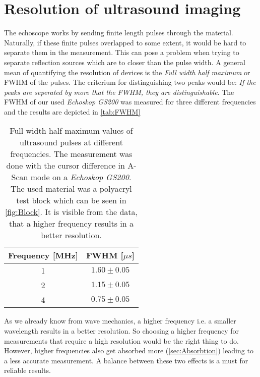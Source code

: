 \documentclass[a4paper,10pt,twocolumn]{article}
\begin{document}
    
    
    \section{Resolution of ultrasound imaging}\label{sec:Resolution}
    The echoscope works by sending finite length pulses through the material.
    Naturally, if these finite pulses overlapped to some extent, it would be hard to separate them in the measurement.
    This can pose a problem when trying to separate reflection sources which are to closer than the pulse width.
    A general mean of quantifying the resolution of devices is the \textit{Full width half maximum} or FWHM of the pulses.
    The criterium for distinguishing two peaks would be: \textit{If the peaks are seperated by more that the FWHM, they are distinguishable}.
    The FWHM of our used \textit{Echoskop GS200} was measured for three different frequencies and the results are depicted in \autoref{tab:FWHM}
    \begin{table}[htbp]
        \centering
        \begin{tabular*}{0.9\linewidth}{@{\extracolsep{\fill}}cc}
            \hline
            \hline
            \rule[-7pt]{0pt}{23pt}  Frequency [MHz]  &  FWHM [$\mu s$] 	 \\
            \hline
            \rule[-5pt]{0pt}{23pt}    1   &  $1.60 \pm 0.05 $	 \\
            \rule[-5pt]{0pt}{23pt}    2   &    $1.15 \pm 0.05$  \\
            \rule[-5pt]{0pt}{23pt}    4   &   $0.75 \pm 0.05$  \\
            \hline
            \hline
        \end{tabular*}
        \normalsize
        \caption[]{Full width half maximum values of ultrasound pulses at different frequencies.
        The measurement was done with the cursor difference in A-Scan mode on a \textit{Echoskop GS200}.
        The used material was a polyacryl test block which can be seen in \autoref{fig:Block}.
        It is visible from the data, that a higher frequency results in a better resolution.}
        \label{tab:FWHM}
    \end{table}
    
    As we already know from wave mechanics, a higher frequency i.e. a smaller wavelength results in a better resolution.
    So choosing a higher frequency for measurements that require a high resolution would be the right thing to do.
    However, higher frequencies also get absorbed more (\autoref{sec:Absorbtion}) leading to a less accurate measurement.
    A balance between these two effects is a must for reliable results.
    
\end{document}
